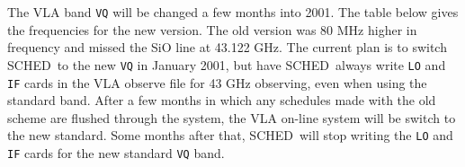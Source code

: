 \documentclass{report}
\newcommand{\schedb}{{\sc SCHED~}}
\begin{document}

The VLA band {\tt VQ} will be changed a few months into 2001.  The
table below gives the frequencies for the new version.  The old version
was 80 MHz higher in frequency and missed the SiO line at 43.122 GHz.
The current plan is to switch \schedb to the new {\tt VQ} in January
2001, but have \schedb always write {\tt LO} and {\tt IF} cards in
the VLA observe file for 43 GHz observing, even when using the standard
band.  After a few months in which any schedules made with the old
scheme are flushed through the system, the VLA on-line system will
be switch to the new standard.  Some months after that, \schedb will
stop writing the {\tt LO} and {\tt IF} cards for the new standard
{\tt VQ} band.
\end{document}
